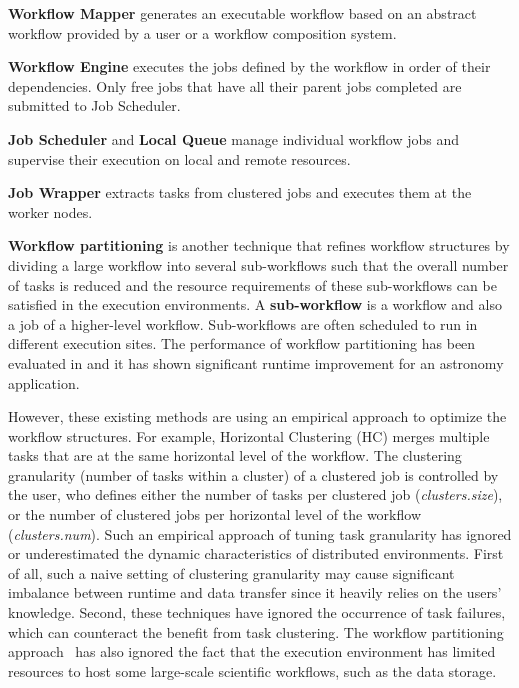 \textbf{Workflow Mapper} generates an executable workflow based on an abstract workflow provided by a user or a workflow composition system. 

\textbf{Workflow Engine} executes the jobs defined by the workflow in order of their dependencies. Only free jobs that have all their parent jobs completed are submitted to  Job Scheduler. 

\textbf{Job Scheduler} and \textbf{Local Queue} manage individual workflow jobs and supervise their execution on local and remote resources.

\textbf{Job Wrapper} extracts tasks from clustered jobs and executes them at the worker nodes. 

\textbf{Workflow partitioning} is another technique that refines workflow structures by dividing a large workflow into several sub-workflows such that the overall number of tasks is reduced and the resource requirements of these sub-workflows can be satisfied in the execution environments. A \textbf{sub-workflow} is a workflow and also a job of a higher-level workflow. Sub-workflows are often scheduled to run in different execution sites. The performance of workflow partitioning has been evaluated in \cite{Rynge2012} and it has shown significant runtime improvement for an astronomy application. 
 
However, these existing methods are using an empirical approach to optimize the workflow structures. For example, Horizontal Clustering (HC) \cite{Singh2008} merges multiple tasks that are at the same horizontal level of the workflow. The clustering granularity (number of tasks within a cluster) of a clustered job is controlled by the user, who defines either the number of tasks per clustered job (\textit{clusters.size}), or the number of clustered jobs per horizontal level of the workflow (\textit{clusters.num}). Such an empirical approach of tuning task granularity has ignored or underestimated the dynamic characteristics of distributed environments. First of all, such a naive setting of clustering granularity may cause significant imbalance between runtime and data transfer since it heavily relies on the users' knowledge. Second, these techniques have ignored the occurrence of task failures, which can counteract the benefit from task clustering. The workflow partitioning approach~\cite{Rynge2012} has also ignored the fact that the execution environment has limited resources to host some large-scale scientific workflows, such as the data storage. 

